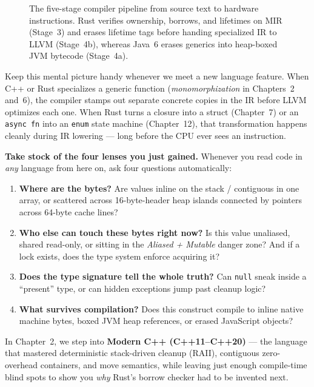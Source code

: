 \begin{figure}[H]
\caption{The five-stage compiler pipeline from source text to hardware instructions. Rust verifies ownership, borrows, and lifetimes on MIR (Stage~3) and erases lifetime tags before handing specialized IR to LLVM (Stage~4b), whereas Java~6 erases generics into heap-boxed JVM bytecode (Stage~4a).}
\label{ch01:fig-compiler-pipeline}
\end{figure}

\begin{happeningbox}
Keep this mental picture handy whenever we meet a new language feature. When C++ or Rust specializes a generic function (\emph{monomorphization} in Chapters~2 and~6), the compiler stamps out separate concrete copies in the IR before LLVM optimizes each one. When Rust turns a closure into a struct (Chapter~7) or an \texttt{async fn} into an \texttt{enum} state machine (Chapter~12), that transformation happens cleanly during IR lowering --- long before the CPU ever sees an instruction.
\end{happeningbox}

\begin{recoverybox}
\textbf{Take stock of the four lenses you just gained.}
Whenever you read code in \emph{any} language from here on, ask four questions automatically:
\begin{enumerate}
  \item \textbf{Where are the bytes?} Are values inline on the stack / contiguous in one array, or scattered across 16-byte-header heap islands connected by pointers across 64-byte cache lines?
  \item \textbf{Who else can touch these bytes right now?} Is this value unaliased, shared read-only, or sitting in the \emph{Aliased + Mutable} danger zone? And if a lock exists, does the type system enforce acquiring it?
  \item \textbf{Does the type signature tell the whole truth?} Can \texttt{null} sneak inside a ``present'' type, or can hidden exceptions jump past cleanup logic?
  \item \textbf{What survives compilation?} Does this construct compile to inline native machine bytes, boxed JVM heap references, or erased JavaScript objects?
\end{enumerate}
In Chapter~2, we step into \textbf{Modern C++ (C++11--C++20)} --- the language that mastered deterministic stack-driven cleanup (RAII), contiguous zero-overhead containers, and move semantics, while leaving just enough compile-time blind spots to show you \emph{why} Rust's borrow checker had to be invented next.
\end{recoverybox}

